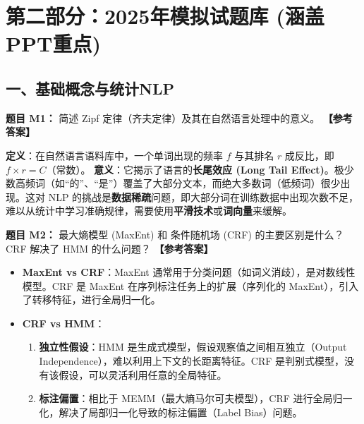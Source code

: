 \documentclass[a4paper,11pt]{article}
\newenvironment{question}[1]
    {\vspace{0.5cm}\noindent\textbf{题目 #1：}}
    {\vspace{0.2cm}}
\newenvironment{answer}
    {\noindent\textbf{【参考答案】}\par\small\color{blue}}
    {\par\vspace{0.5cm}\normalcolor}
\begin{document}
\section{第二部分：2025年模拟试题库 (涵盖PPT重点)}

\subsection{一、基础概念与统计NLP}

\begin{question}{M1}
简述 Zipf 定律（齐夫定律）及其在自然语言处理中的意义。
\end{question}
\begin{answer}
\textbf{定义}：在自然语言语料库中，一个单词出现的频率 $f$ 与其排名 $r$ 成反比，即 $f \times r = C$（常数）。
\textbf{意义}：它揭示了语言的\textbf{长尾效应 (Long Tail Effect)}。极少数高频词（如“的”、“是”）覆盖了大部分文本，而绝大多数词（低频词）很少出现。这对 NLP 的挑战是\textbf{数据稀疏}问题，即大部分词在训练数据中出现次数不足，难以从统计中学习准确规律，需要使用\textbf{平滑技术}或\textbf{词向量}来缓解。
\end{answer}

\begin{question}{M2}
最大熵模型 (MaxEnt) 和 条件随机场 (CRF) 的主要区别是什么？CRF 解决了 HMM 的什么问题？
\end{question}
\begin{answer}
\begin{itemize}
    \item \textbf{MaxEnt vs CRF}：MaxEnt 通常用于分类问题（如词义消歧），是对数线性模型。CRF 是 MaxEnt 在序列标注任务上的扩展（序列化的 MaxEnt），引入了转移特征，进行全局归一化。
    \item \textbf{CRF vs HMM}：
    \begin{enumerate}
        \item \textbf{独立性假设}：HMM 是生成式模型，假设观察值之间相互独立（Output Independence），难以利用上下文的长距离特征。CRF 是判别式模型，没有该假设，可以灵活利用任意的全局特征。
        \item \textbf{标注偏置}：相比于 MEMM（最大熵马尔可夫模型），CRF 进行全局归一化，解决了局部归一化导致的标注偏置（Label Bias）问题。
    \end{enumerate}
\end{itemize}
\end{answer}
\end{document}
